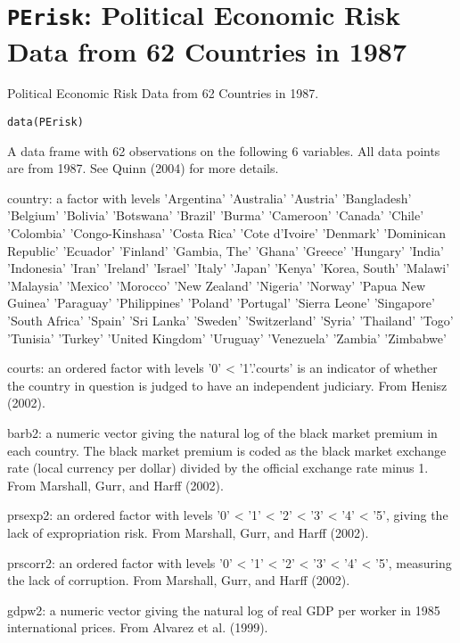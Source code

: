  \section{{\tt PErisk}: Political Economic Risk Data from 62 Countries in 1987}\label{ss:PErisk}
\begin{Description}\relax
Political Economic Risk Data from 62 Countries in 1987.
\end{Description}
\begin{Usage}
\begin{verbatim}data(PErisk)\end{verbatim}
\end{Usage}
\begin{Format}\relax
A data frame with 62 observations on the following 6 variables.
All data points are from 1987. See Quinn (2004) for more
details. 

country: a factor with levels 'Argentina' 'Australia' 'Austria'
'Bangladesh' 'Belgium' 'Bolivia' 'Botswana' 'Brazil' 'Burma'
'Cameroon' 'Canada' 'Chile' 'Colombia' 'Congo-Kinshasa'
'Costa Rica' 'Cote d'Ivoire' 'Denmark' 'Dominican Republic'
'Ecuador' 'Finland' 'Gambia, The' 'Ghana' 'Greece' 'Hungary'
'India' 'Indonesia' 'Iran' 'Ireland' 'Israel' 'Italy' 'Japan'
'Kenya' 'Korea, South' 'Malawi' 'Malaysia' 'Mexico' 'Morocco'
'New Zealand' 'Nigeria' 'Norway' 'Papua New Guinea'
'Paraguay' 'Philippines' 'Poland' 'Portugal' 'Sierra Leone'
'Singapore' 'South Africa' 'Spain' 'Sri Lanka' 'Sweden'
'Switzerland' 'Syria' 'Thailand' 'Togo' 'Tunisia' 'Turkey'
'United Kingdom' 'Uruguay' 'Venezuela' 'Zambia' 'Zimbabwe'

courts: an ordered factor with levels '0' < '1'.'courts' is an
indicator of whether the country in question is judged to
have an independent judiciary. From Henisz (2002).

barb2: a numeric vector giving the natural log of the black market
premium in each country. The black market premium is coded as
the black market exchange rate (local currency per dollar)
divided by the official exchange  rate minus 1. From
Marshall, Gurr, and Harff (2002). 

prsexp2: an ordered factor with levels '0' < '1' < '2' < '3' < '4'
< '5', giving the lack of expropriation risk. From Marshall,
Gurr, and Harff (2002).

prscorr2: an ordered factor with levels '0' < '1' < '2' < '3' < '4'
< '5', measuring the lack of corruption. From Marshall, Gurr,
and Harff (2002).

gdpw2: a numeric vector giving the natural log of real GDP per
worker in 1985 international prices. From Alvarez et al.
(1999).
\end{Format}
